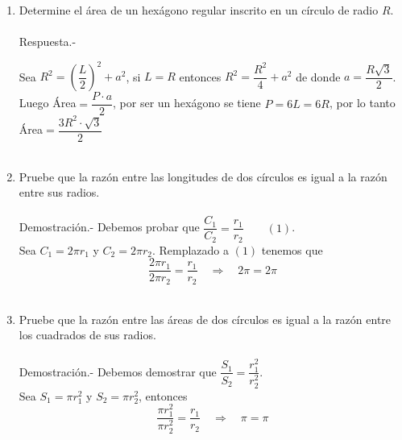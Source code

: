 \documentclass[10pt]{article}
\begin{document}
\begin{enumerate}
\item Determine el área de un hexágono regular inscrito en un círculo de radio $R$.\\\\
    Respuesta.-\;
	\begin{center}
	\end{center}
	Sea $R^2 = \left(\dfrac{L}{2}\right)^2 + a^2$, si $L=R$ entonces $R^2 = \dfrac{R^2}{4} + a^2$ de donde $a=\dfrac{R \sqrt{3}}{2}$. Luego Área$ = \dfrac{P\cdot a}{2} $, por ser un hexágono se tiene $P=6L=6R$, por lo tanto Área$=\dfrac{3R^2\cdot \sqrt{3}}{2}$\\\\ 

\item Pruebe que la razón entre las longitudes de dos círculos es igual a la razón entre sus radios.\\\\
    Demostración.-\; Debemos probar que $\dfrac{C_1}{C_2}=\dfrac{r_1}{r_2} \qquad (1)$.\\
	Sea $C_1=2\pi r_1$  y $C_2=2\pi r_2$. Remplazado a $(1)$ tenemos que $$\dfrac{2\pi r_1}{2\pi r_2}=\dfrac{r_1}{r_2} \quad \Longrightarrow \quad 2\pi = 2\pi$$\\

\item Pruebe que la razón entre las áreas de dos círculos es igual a la razón entre los cuadrados de sus radios.\\\\
    Demostración.-\; Debemos demostrar que $\dfrac{S_1}{S_2}=\dfrac{r_1^2}{r_2^2}$.\\
	Sea $S_1=\pi r_1^2$ y $S_2 = \pi r_2^2$, entonces $$\dfrac{\pi r_1^2}{\pi r_2^2}=\dfrac{r_1}{r_2} \quad \Longrightarrow \quad \pi=\pi$$\\


\end{enumerate}
\end{document}

